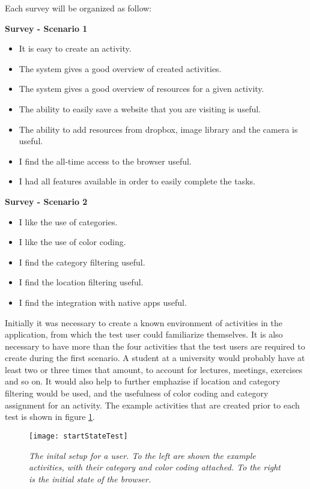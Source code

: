 Each survey will be organized as follow:
\par\vspace{\baselineskip}
\textbf{Survey - Scenario 1}
\begin{itemize}
	\item It is easy to create an activity.
	\item The system gives a good overview of created activities.
	\item The system gives a good overview of resources for a given activity.
	\item The ability to easily save a website that you are visiting is useful.
	\item The ability to add resources from dropbox, image library and the camera is useful.
	\item I find the all-time access to the browser useful.
	\item I had all features available in order to easily complete the tasks.
\end{itemize}

\textbf{Survey - Scenario 2}
\begin{itemize}
	\item I like the use of categories.
	\item I like the use of color coding.
	\item I find the category filtering useful.
	\item I find the location filtering useful.
	\item I find the integration with native apps useful.
\end{itemize}

Initially it was necessary to create a known environment of activities in the application, from which the test user could familiarize themselves. It is also necessary to have more than the four activities that the test users are required to create during the first scenario. A student at a university would probably have at least two or three times that amount, to account for lectures, meetings, exercises and so on. It would also help to further emphazise if location and category filtering would be used, and the usefulness of color coding and category assignment for an activity. The example activities that are created prior to each test is shown in figure \ref{fig:initial}.

\begin{figure}[h!]
  \centering
    \texttt{[image: startStateTest]}
  \caption{\emph{The inital setup for a user. To the left are shown the example activities, with their category and color coding attached. To the right is the initial state of the browser.}}
  \label{fig:initial}
\end{figure}

